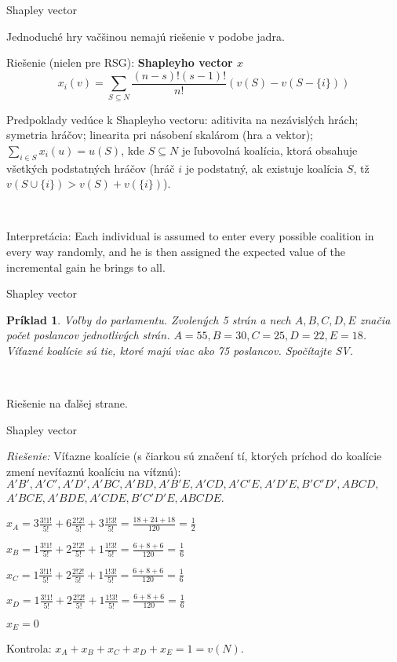 \documentclass{beamer}
\newtheorem*{exampl}{Pr\'iklad}
\begin{document}
\begin{frame}{Shapley vector}

Jednoduch\'e hry va\v{c}\v{s}inou nemaj\'u rie\v{s}enie v podobe jadra.

Rie\v{s}enie (nielen pre RSG): {\bf Shapleyho vector $x$}
\[x_{i}(v)=\sum_{S \subseteq N}\frac{(n-s)!(s-1)!}{n!}(v(S)-v(S-\{i\}))\]

Predpoklady ved\'uce k Shapleyho vectoru: aditivita na nez\'avisl\'ych hr\'ach; symetria hr\'a\v{c}ov; linearita pri n\'asoben\'i skal\'arom (hra a vektor); $\sum_{i \in S} x_{i}(u) = u(S)$, kde $S \subseteq N$ je \v{l}ubovoln\'a koal\'icia, ktor\'a obsahuje v\v{s}etk\'ych podstatn\'ych hr\'a\v{c}ov (hr\'a\v{c} $i$ je podstatn\'y, ak existuje koal\'icia $S$, t\v{z} $v(S \cup \{i\})> v(S) + v(\{i\})$).

\

Interpret\'acia: Each individual is assumed to enter every possible coalition in every way randomly, and he is then assigned the expected value of the incremental gain he brings to all.

\end{frame}




\begin{frame}{Shapley vector}

\begin{exampl}
Vo\v{l}by do parlamentu. Zvolen\'ych 5 str\'an a nech $A,B,C,D,E$ zna\v{c}ia po\v{c}et poslancov jednotliv\'ych str\'an. $A=55, B=30, C=25, D=22, E=18$. V\'i\v{t}azn\'e koal\'icie s\'u tie, ktor\'e maj\'u viac ako 75 poslancov. Spo\v{c}\'itajte SV.
\end{exampl}

\

Rie\v{s}enie na \v{d}al\v{s}ej strane. 

\end{frame}




\begin{frame}{Shapley vector}

\emph{Rie\v{s}enie:} V\'i\v{t}azne koal\'icie (s \v{c}iarkou s\'u zna\v{c}en\'i t\'i, ktor\'ych pr\'ichod do koal\'icie zmen\'i nev\'i\v{t}azn\'u koal\'iciu na v\'i\v{t}zn\'u): $A'B', A'C', A'D', A'BC, A'BD, A'B'E, A'CD, A'C'E, A'D'E, B'C'D', ABCD,$ $ A'BCE, A'BDE, A'CDE, B'C'D'E, ABCDE$.

$x_{A} = 3 \frac{3!1!}{5!} + 6 \frac{2!2!}{5!} + 3 \frac{1!3!}{5!}= \frac{18+24+18}{120}=\frac{1}{2}$

$x_{B} = 1 \frac{3!1!}{5!} + 2 \frac{2!2!}{5!} + 1 \frac{1!3!}{5!}= \frac{6+8+6}{120} = \frac{1}{6}$

$x_{C} = 1 \frac{3!1!}{5!} + 2 \frac{2!2!}{5!} + 1 \frac{1!3!}{5!}= \frac{6+8+6}{120} = \frac{1}{6}$

$x_{D} = 1 \frac{3!1!}{5!} + 2 \frac{2!2!}{5!} + 1 \frac{1!3!}{5!}= \frac{6+8+6}{120} = \frac{1}{6}$

$x_{E} = 0$

Kontrola: $x_{A}+x_{B}+x_{C}+x_{D}+x_{E}=1=v(N)$.



\end{frame}
\end{document}
